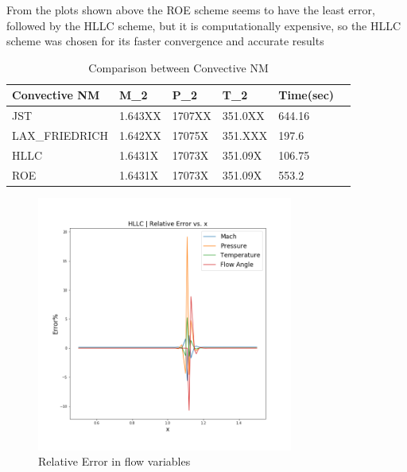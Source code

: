 From the plots shown above the ROE scheme seems to have the least error, followed by the HLLC scheme, but it is computationally expensive, so the HLLC scheme was chosen for its faster convergence and accurate results\\
\begin{table}[h]
    \centering
    \begin{tabular}{|l|l|l|l|l|l|}
    \hline
    Convective NM & M_2 & P_2 & T_2 & Time(sec)\\
    \hline
    JST & 1.643XX & 1707XX & 351.0XX & 644.16\\
    \hline
    LAX\_FRIEDRICH & 1.642XX & 17075X & 351.XXX & 197.6\\
    \hline
    HLLC & 1.6431X & 17073X & 351.09X & 106.75\\
    \hline
    ROE & 1.6431X & 17073X & 351.09X & 553.2\\
    \hline
\end{tabular}
    \caption{Comparison between Convective NM}
    \label{tab:Comparisonbetween Convective NM }
\end{table}
\newpage
\begin{figure}
    \centering
    \includegraphics[width=0.75\textwidth]{text/error_HLLC.png}   
    \caption[HLLC - Relative Error]{Relative Error in flow variables}
    \label{fig:HLLC - Relative Error}
\end{figure}

